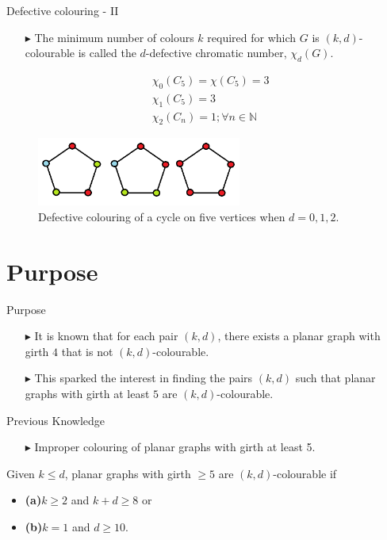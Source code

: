 \documentclass[10pt, compress]{beamer}
\begin{document}
\begin{frame}{Defective colouring - II}
\begin{itemize}
\item[$\blacktriangleright$] The minimum number of colours $k$ required for which $G$ is $(k, d)$-colourable is called the $d$-defective chromatic number, $\chi_d(G)$.
\end{itemize}
\begin{align*}
&\chi_{0}(C_{5})=\chi (C_{5})=3\\
&\chi_{1}(C_{5})=3\\
&\chi_{2}(C_{n})=1;\forall n\in \mathbb {N} 
\end{align*}
\begin{figure}
\centering
\includegraphics[width=0.6\textwidth]{figures/defect.png}
\caption{Defective colouring of a cycle on five vertices when $d = 0, 1, 2$. \cite{defect}}
\end{figure}
\end{frame}

\section{Purpose}

\begin{frame}{Purpose}
\begin{itemize}[itemsep=1cm]
\item[$\blacktriangleright$] It is known that for each pair $(k, d)$, there exists a planar graph with girth $4$ that is not $(k, d)$-colourable.
\item[$\blacktriangleright$] This sparked the interest in finding the pairs $(k, d)$ such that planar graphs with girth at least $5$ are $(k, d)$-colourable.
\end{itemize}
\end{frame}

\begin{frame}{Previous Knowledge}
\begin{itemize}
\item[$\blacktriangleright$] Improper colouring of planar graphs with girth at least 5.
\end{itemize}
\begin{theorem}[1.1]
Given $k\leq d$, planar graphs with girth $\geq5$ are $(k,d)$-colourable if
\vspace{0.25cm}
\begin{itemize}[itemsep=0.5cm]
\item\textbf{(a)}\hspace{0.25cm}$k \geq 2$ and $k+d \geq 8$ or
\item\textbf{(b)}\hspace{0.25cm}$k=1$ and $d\geq 10$.
\end{itemize}
\end{theorem}
\end{frame}
\end{document}

